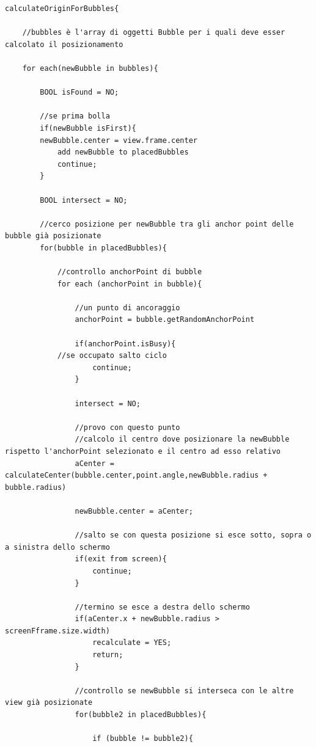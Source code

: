 \begin{lstlisting}[label=algo:3,caption=calculateOriginForBubbles,breaklines=true,  commentstyle=\color{CadetBlue}]
calculateOriginForBubbles{

    //bubbles è l'array di oggetti Bubble per i quali deve esser calcolato il posizionamento
  
    for each(newBubble in bubbles){

        BOOL isFound = NO;

        //se prima bolla
        if(newBubble isFirst){
	    newBubble.center = view.frame.center
            add newBubble to placedBubbles
            continue;
        }

        BOOL intersect = NO;

        //cerco posizione per newBubble tra gli anchor point delle bubble già posizionate
        for(bubble in placedBubbles){

            //controllo anchorPoint di bubble
            for each (anchorPoint in bubble){

                //un punto di ancoraggio
                anchorPoint = bubble.getRandomAnchorPoint

                if(anchorPoint.isBusy){
		    //se occupato salto ciclo
                    continue;
                }

                intersect = NO;

                //provo con questo punto
                //calcolo il centro dove posizionare la newBubble rispetto l'anchorPoint selezionato e il centro ad esso relativo
                aCenter = calculateCenter(bubble.center,point.angle,newBubble.radius + bubble.radius)

                newBubble.center = aCenter;

                //salto se con questa posizione si esce sotto, sopra o a sinistra dello schermo
                if(exit from screen){
                    continue;
                }

                //termino se esce a destra dello schermo
                if(aCenter.x + newBubble.radius > screenFframe.size.width)
                    recalculate = YES;
                    return;
                }

                //controllo se newBubble si interseca con le altre view già posizionate
                for(bubble2 in placedBubbles){

                    if (bubble != bubble2){
	    

\end{lstlisting}
